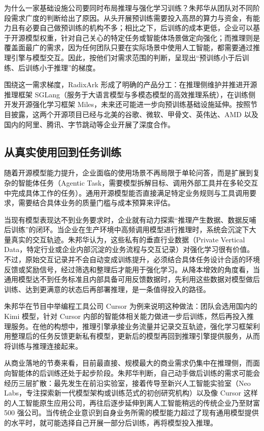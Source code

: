 \documentclass[UTF8,a4paper,11pt,fontset=fandol]{ctexart}
\begin{document}
为什么一家基础设施公司要同时布局推理与强化学习训练？朱邦华从团队对不同阶段需求广度的判断给出了原因。从头开展预训练需要投入高昂的算力与资金，有能力且有必要自己做预训练的机构不多；相比之下，后训练的成本更低，企业可以基于开源模型权重，针对自己关心的特定任务或智能体场景做定向强化；而推理则是覆盖面最广的需求，因为任何团队只要在实际场景中使用人工智能，都需要通过推理引擎与模型交互。因此，按他们对需求范围的判断，呈现出“预训练小于后训练、后训练小于推理”的梯度。

围绕这一需求梯度，RadixArk 形成了明确的产品分工：在推理侧维护并推进开源推理框架 SGLang（服务于大语言模型与多模态模型的高效推理系统），在训练侧开发开源强化学习框架 Miles，未来还可能进一步向预训练基础设施延伸。按照节目披露，这两个开源项目已经与北美的谷歌、微软、甲骨文、英伟达、AMD 以及国内的阿里、腾讯、字节跳动等企业开展了深度合作。

\subsection{从真实使用回到任务训练}
随着开源模型能力提升，企业面临的使用场景不再局限于单轮问答，而是扩展到复杂的智能体任务（Agentic Task，需要模型拆解目标、调用外部工具并在多轮交互中完成具体工作的任务）。通用开源模型能否直接满足特定业务规则与工具调用要求，需要结合具体业务的质量门槛与成本预算来评估。

当现有模型表现达不到业务要求时，企业就有动力探索“推理产生数据、数据反哺后训练”的闭环。当企业在生产环境中高频调用模型进行推理时，系统会沉淀下大量真实的交互轨迹。朱邦华认为，这些私有的垂直行业数据（Private Vertical Data，特定行业或企业内部沉淀的业务流程与交互记录）对强化学习很有价值。不过，原始交互记录并不会自动变成训练提升，必须结合具体任务设计合适的环境反馈或奖励信号，经过筛选和整理后才能用于强化学习。从降本增效的角度看，当通用模型达不到任务标准且内部具备可用反馈数据时，先利用这些数据对模型做后训练、达到更满意的状态后再部署推理，是一条值得投入的路径。

朱邦华在节目中举编程工具公司 Cursor 为例来说明这种做法：团队会选用国内的 Kimi 模型，针对 Cursor 内部的智能体相关能力做进一步后训练，然后再投入推理服务。在他的构想中，推理引擎承接业务流量并记录交互轨迹，强化学习框架利用整理后的任务反馈更新私有模型，更新后的模型再回到推理引擎提供服务，从而将训练与推理连接起来。

从商业落地的节奏来看，目前最直接、规模最大的商业需求仍集中在推理侧，而面向智能体的后训练还处于起步阶段。朱邦华判断，自己动手做后训练的需求可能会经历三层扩散：最先发生在前沿实验室，接着传导至新兴人工智能实验室（Neo Labs，专注探索新一代模型架构或训练范式的初创研究机构）以及像 Cursor 这样的人工智能原生应用公司，再往后逐步延伸到离人工智能稍远的传统企业乃至财富 500 强公司。当传统企业意识到自身业务所需的模型能力超过了现有通用模型提供的水平时，就可能选择自己开展一部分后训练，再将模型投入推理。
\end{document}
